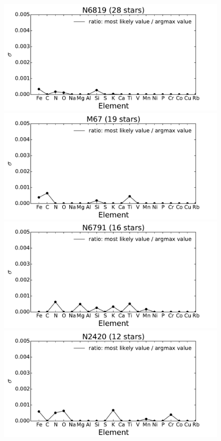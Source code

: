 \documentclass[14pt, preprint2]{aastex6}
\begin{document}
\begin{figure}
\centering
   \includegraphics[scale=0.4]{N6819_ratio.pdf}
 \includegraphics[scale=0.4]{M67_ratio.pdf}\\
   \includegraphics[scale=0.4]{N6791_ratio.pdf}
     \includegraphics[scale=0.4]{N2420_ratio.pdf}\\

\end{figure}
\end{document}
